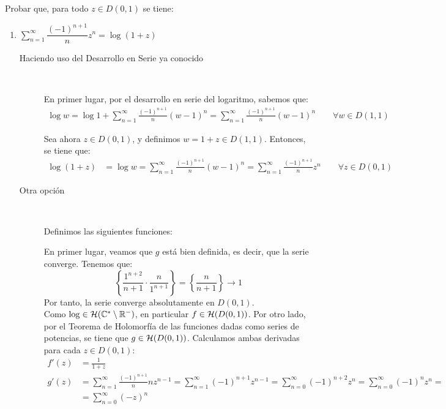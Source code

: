 \begin{ejercicio}
    Probar que, para todo $z \in D(0,1)$ se tiene:
    \begin{enumerate}
        \item $\sum\limits_{n= 1}^\infty \dfrac{(-1)^{n+1}}{n}z^n = \log(1+z)$
        
        \begin{description}
            \item[Haciendo uso del Desarrollo en Serie ya conocido]~
            
            En primer lugar, por el desarrollo en serie del logaritmo, sabemos que:
            \begin{align*}
                \log w = \log 1 + \sum_{n=1}^\infty \frac{(-1)^{n+1}}{n}\left(w - 1\right)^n = \sum_{n=1}^\infty \frac{(-1)^{n+1}}{n}\left(w - 1\right)^n\qquad \forall w\in D(1,1)
            \end{align*}

            Sea ahora $z\in D(0,1)$, y definimos $w = 1+z\in D(1,1)$. Entonces, se tiene que:
            \begin{align*}
                \log(1+z) &= \log w = \sum_{n=1}^\infty \frac{(-1)^{n+1}}{n}\left(w - 1\right)^n = \sum_{n=1}^\infty \frac{(-1)^{n+1}}{n}z^n\qquad \forall z\in D(0,1)
            \end{align*}

            \item[Otra opción]~
            
            Definimos las siguientes funciones:

            En primer lugar, veamos que $g$ está bien definida, es decir, que la serie converge. Tenemos que:
            \begin{equation*}
                \left\{\dfrac{1^{n+2}}{n+1}\cdot \dfrac{n}{1^{n+1}}\right\} = \left\{\dfrac{n}{n+1}\right\}\to 1
            \end{equation*}
            Por tanto, la serie converge absolutamente en $D(0,1)$.\\

            Como $\log\in \mathcal{H}(\mathbb{C}^*\setminus\mathbb{R}^-)$, en particular $f\in \mathcal{H}(D(0,1))$. Por otro lado, por el Teorema de Holomorfía de las funciones dadas como series de potencias, se tiene que $g\in \mathcal{H}(D(0,1))$. Calculamos ambas derivadas para cada $z\in D(0,1)$:
            \begin{align*}
                f'(z) &= \frac{1}{1+z} \\
                g'(z) &= \sum_{n=1}^\infty \frac{(-1)^{n+1}}{n}nz^{n-1} = \sum_{n=1}^\infty (-1)^{n+1}z^{n-1} = \sum_{n=0}^\infty (-1)^{n+2}z^{n} = \sum_{n=0}^\infty (-1)^{n}z^{n}
                =\\&= \sum_{n=0}^\infty (-z)^{n}
            \end{align*}


\end{description}
\end{enumerate}
\end{ejercicio}

